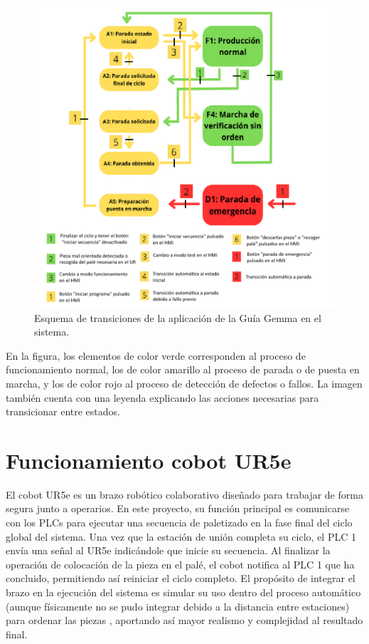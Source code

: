 \clearpage

\begin{figure}[h!]
  \begin{center}
  	\includegraphics[width=16.5cm]{figs/guia_gemma_final}
  \end{center}
  \caption{\centering Esquema de transiciones de la aplicación de la Guía Gemma en el sistema.}
  \label{fig:guia_gemma_final}
\end{figure}

En la figura, los elementos de color verde corresponden al proceso de funcionamiento normal, los de color amarillo al proceso de parada o de puesta en marcha, y los de color rojo al proceso de detección de defectos o fallos. La imagen también cuenta con una leyenda explicando las acciones necesarias para transicionar entre estados.

\clearpage

\section{Funcionamiento cobot UR5e}
\label{sec:funcionamiento_ur5e}

El cobot UR5e es un brazo robótico colaborativo diseñado para trabajar de forma segura junto a operarios. En este proyecto, su función principal es comunicarse con los PLCs para ejecutar una secuencia de paletizado en la fase final del ciclo global del sistema. Una vez que la estación de unión completa su ciclo, el PLC 1 envía una señal al UR5e indicándole que inicie su secuencia. Al finalizar la operación de colocación de la pieza en el palé, el cobot notifica al PLC 1 que ha concluido, permitiendo así reiniciar el ciclo completo. El propósito de integrar el brazo en la ejecución del sistema es simular su uso dentro del proceso automático (aunque físicamente no se pudo integrar debido a la distancia entre estaciones) para ordenar las piezas , aportando así mayor realismo y complejidad al resultado final. 

